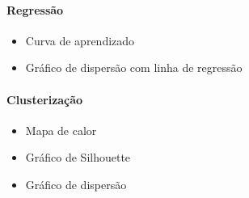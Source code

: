 \documentclass[a4paper,12pt]{article}
\begin{document}
\paragraph{Regressão}
\begin{itemize}
    \item Curva de aprendizado
    \item Gráfico de dispersão com linha de regressão
\end{itemize}

\paragraph{Clusterização}
\begin{itemize}
    \item Mapa de calor
    \item Gráfico de Silhouette
    \item Gráfico de dispersão
\end{itemize}
\end{document}

